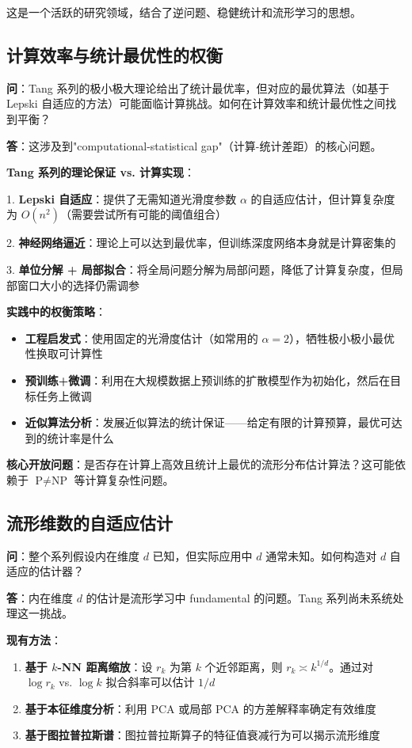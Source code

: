 这是一个活跃的研究领域，结合了逆问题、稳健统计和流形学习的思想。

\subsection{计算效率与统计最优性的权衡}\label{sec:qa-computation-statistics-tradeoff}

\textbf{问}：Tang 系列的极小极大理论给出了统计最优率，但对应的最优算法（如基于 Lepski 自适应的方法）可能面临计算挑战。如何在计算效率和统计最优性之间找到平衡？

\textbf{答}：这涉及到"computational-statistical gap"（计算-统计差距）的核心问题。

\textbf{Tang 系列的理论保证 vs. 计算实现}：

1. \textbf{Lepski 自适应}：提供了无需知道光滑度参数 $\alpha$ 的自适应估计，但计算复杂度为 $O(n^2)$（需要尝试所有可能的阈值组合）

2. \textbf{神经网络逼近}：理论上可以达到最优率，但训练深度网络本身就是计算密集的

3. \textbf{单位分解 + 局部拟合}：将全局问题分解为局部问题，降低了计算复杂度，但局部窗口大小的选择仍需调参

\textbf{实践中的权衡策略}：
\begin{itemize}
    \item \textbf{工程启发式}：使用固定的光滑度估计（如常用的 $\alpha=2$），牺牲极小极小最优性换取可计算性
    \item \textbf{预训练+微调}：利用在大规模数据上预训练的扩散模型作为初始化，然后在目标任务上微调
    \item \textbf{近似算法分析}：发展近似算法的统计保证——给定有限的计算预算，最优可达到的统计率是什么
\end{itemize}

\textbf{核心开放问题}：是否存在计算上高效且统计上最优的流形分布估计算法？这可能依赖于 $\text{P} \neq \text{NP}$ 等计算复杂性问题。

\subsection{流形维数的自适应估计}\label{sec:qa-dimension-adaptivity}

\textbf{问}：整个系列假设内在维度 $d$ 已知，但实际应用中 $d$ 通常未知。如何构造对 $d$ 自适应的估计器？

\textbf{答}：内在维度 $d$ 的估计是流形学习中 fundamental 的问题。Tang 系列尚未系统处理这一挑战。

\textbf{现有方法}：
\begin{enumerate}
    \item \textbf{基于 $k$-NN 距离缩放}：设 $r_k$ 为第 $k$ 个近邻距离，则 $r_k \asymp k^{1/d}$。通过对 $\log r_k$ vs. $\log k$ 拟合斜率可以估计 $1/d$
    \item \textbf{基于本征维度分析}：利用 PCA 或局部 PCA 的方差解释率确定有效维度
    \item \textbf{基于图拉普拉斯谱}：图拉普拉斯算子的特征值衰减行为可以揭示流形维度
\end{enumerate}

